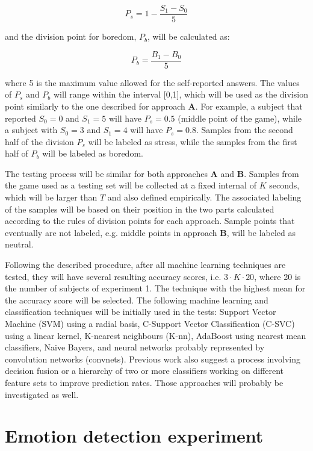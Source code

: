 \begin{equation}
P_s = 1 - \frac{S_1 - S_0}{5}
\end{equation}

and the division point for boredom, $P_b$, will be calculated as:

\begin{equation}
P_b = \frac{B_1 - B_0}{5}
\end{equation}

where 5 is the maximum value allowed for the self-reported answers. The values of $P_s$ and $P_b$ will range within the interval [0,1], which will be used as the division point similarly to the one described for approach \textbf{A}. For example, a subject that reported $S_0=0$ and $S_1=5$ will have $P_s=0.5$ (middle point of the game), while a subject with $S_0=3$ and $S_1=4$ will have $P_s=0.8$. Samples from the second half of the division $P_s$ will be labeled as stress, while the samples from the first half of $P_b$ will be labeled as boredom.

The testing process will be similar for both approaches \textbf{A} and \textbf{B}. Samples from the game used as a testing set will be collected at a fixed internal of $K$ seconds, which will be larger than $T$ and also defined empirically. The associated labeling of the samples will be based on their position in the two parts calculated according to the rules of division points for each approach. Sample points that eventually are not labeled, e.g. middle points in approach \textbf{B}, will be labeled as neutral.

Following the described procedure, after all machine learning techniques are tested, they will have several resulting accuracy scores, i.e. $3 \cdot K \cdot 20$, where 20 is the number of subjects of experiment 1. The technique with the highest mean for the accuracy score will be selected. The following machine learning and classification techniques will be initially used in the tests: Support Vector Machine (SVM) using a radial basis, C-Support Vector Classification (C-SVC) using a linear kernel, K-nearest neighbours (K-nn), AdaBoost using nearest mean classifiers, Naive Bayers, and neural networks probably represented by convolution networks (convnets). Previous work also suggest a process involving decision fusion or a hierarchy of two or more classifiers working on different feature sets to improve prediction rates. Those approaches will probably be investigated as well.

\section{Emotion detection experiment}

